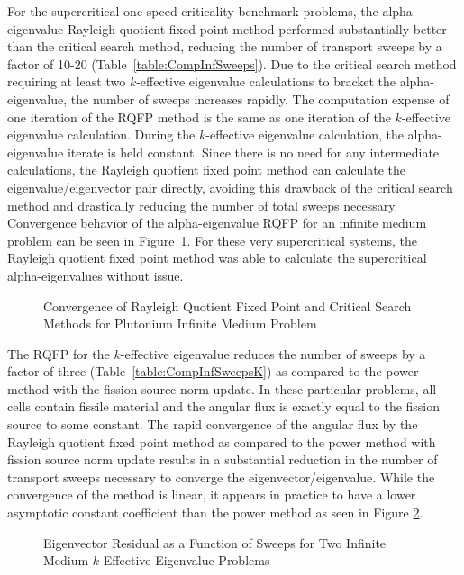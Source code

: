 For the supercritical one-speed criticality benchmark problems, the alpha-eigenvalue Rayleigh quotient fixed point method performed substantially better than the critical search method, reducing the number of transport sweeps by a factor of 10-20 (Table~\ref{table:CompInfSweeps}). Due to the critical search method requiring at least two $k$-effective eigenvalue calculations to bracket the alpha-eigenvalue, the number of sweeps increases rapidly. The computation expense of one iteration of the RQFP method is the same as one iteration of the $k$-effective eigenvalue calculation. During the $k$-effective eigenvalue calculation, the alpha-eigenvalue iterate is held constant. Since there is no need for any intermediate calculations, the Rayleigh quotient fixed point method can calculate the eigenvalue/eigenvector pair directly, avoiding this drawback of the critical search method and drastically reducing the number of total sweeps necessary. Convergence behavior of the alpha-eigenvalue RQFP for an infinite medium problem can be seen in Figure~\ref{fig:AlphaInfConv}. For these very supercritical systems, the Rayleigh quotient fixed point method was able to calculate the supercritical alpha-eigenvalues without issue.

\begin{figure}[!htbp]
	\centering
	\resizebox{!}{0.45\textheight}{
		
	}
	\caption{Convergence of Rayleigh Quotient Fixed Point and Critical Search Methods for Plutonium Infinite Medium Problem}
	\label{fig:AlphaInfConv}
\end{figure}

The RQFP for the $k$-effective eigenvalue reduces the number of sweeps by a factor of three (Table~\ref{table:CompInfSweepsK}) as compared to the power method with the fission source norm update. In these particular problems, all cells contain fissile material and the angular flux is exactly equal to the fission source to some constant. The rapid convergence of the angular flux by the Rayleigh quotient fixed point method as compared to the power method with fission source norm update results in a substantial reduction in the number of transport sweeps necessary to converge the eigenvector/eigenvalue. While the convergence of the method is linear, it appears in practice to have a lower asymptotic constant coefficient than the power method as seen in Figure \ref{fig:kRes}.

\begin{figure}[!htbp]
	\centering
	\resizebox{!}{0.45\textheight}{
		
	}
	\caption{Eigenvector Residual as a Function of Sweeps for Two Infinite Medium $k$-Effective Eigenvalue Problems}
	\label{fig:kRes}
\end{figure}

